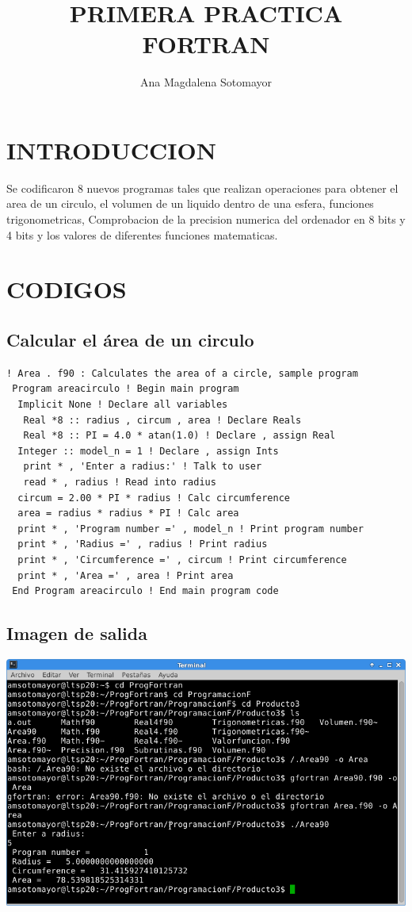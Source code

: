 \documentclass[letterpaper,10pt,twoside,onecolumn]{article}
\begin{document}
 
\title{PRIMERA PRACTICA FORTRAN} 
\author{Ana Magdalena Sotomayor} 

\maketitle 
\section{INTRODUCCION}
Se codificaron 8 nuevos programas tales que realizan operaciones para obtener el area de un circulo, el volumen de un liquido dentro de una esfera, funciones trigonometricas, Comprobacion de la precision numerica del ordenador en 8 bits y 4 bits y los valores de diferentes funciones matematicas.

\section{CODIGOS} 
\subsection{Calcular el área de un circulo}
\begin{verbatim}
! Area . f90 : Calculates the area of a circle, sample program
 Program areacirculo ! Begin main program
  Implicit None ! Declare all variables
   Real *8 :: radius , circum , area ! Declare Reals
   Real *8 :: PI = 4.0 * atan(1.0) ! Declare , assign Real
  Integer :: model_n = 1 ! Declare , assign Ints
   print * , 'Enter a radius:' ! Talk to user
   read * , radius ! Read into radius
  circum = 2.00 * PI * radius ! Calc circumference
  area = radius * radius * PI ! Calc area
  print * , 'Program number =' , model_n ! Print program number
  print * , 'Radius =' , radius ! Print radius
  print * , 'Circumference =' , circum ! Print circumference
  print * , 'Area =' , area ! Print area
 End Program areacirculo ! End main program code
\end{verbatim}

\subsection{Imagen de salida}
\includegraphics[scale=.50]{Area.png}
\end{document}

